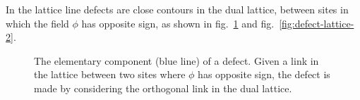 \documentclass[../main/main.tex]{subfiles}
\begin{document}
\skipline

In the lattice line defects are close contours in the dual lattice, between sites in which the field $\phi$ has opposite sign, as shown in fig.~\ref{fig:defect-lattice-1} and fig.~\ref{fig:defect-lattice-2}. 

\begin{figure}[H]
\centering
{}
\caption{The elementary component (blue line) of a defect. Given a link in the lattice between two sites where $\phi$ has opposite sign, the defect is made by considering the orthogonal link in the dual lattice.}
\label{fig:defect-lattice-1}
\end{figure}
\end{document}

